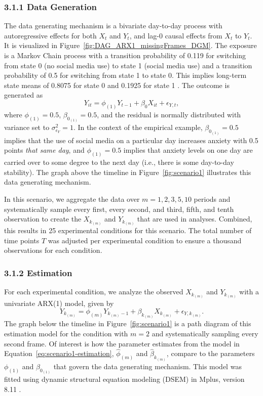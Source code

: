 \documentclass[man]{apa7} %
\begin{document}
\subsubsection{3.1.1 Data Generation} 
The data generating mechanism is a bivariate day-to-day process with autoregressive effects for both $X_{t}$ and $Y_{t}$, and lag-0 causal effects from $X_{t}$ to $Y_{t}$. It is visualized in Figure~\ref{fig:DAG_ARX1_missingFrames_DGM}. The exposure is a Markov Chain process with a transition probability of 0.119 for switching from state 0 (no social media use) to state 1 (social media use) and a transition probability of 0.5 for switching from state 1 to state 0. This implies long-term state means of 0.8075 for state 0 and 0.1925 for state 1 \parencite{hoel_introduction_1986}. The outcome is generated as 
\begin{equation} \label{eq:scenario1-DGM-Y}
    Y_{it} = \phi_{(1)} Y_{t - 1} + \beta_{0} X_{it} + \epsilon_{Y,t}, 
\end{equation}
where $\phi_{(1)} = 0.5$, $\beta_{0_{(1)}} = 0.5$, and the residual is normally distributed with variance set to $\sigma_{\epsilon_{Y}}^{2} = 1$. In the context of the empirical example, $\beta_{0_{(1)}} = 0.5$ implies that the use of social media on a particular day increases anxiety with 0.5 points \textit{that same day}, and $\phi_{(1)} = 0.5$ implies that anxiety levels on one day are carried over to some degree to the next day (i.e., there is some day-to-day stability). The graph above the timeline in Figure~\ref{fig:scenario1} illustrates this data generating mechanism. 

In this scenario, we aggregate the data over $m = 1, 2, 3, 5, 10$ periods and systematically sample every first, every second, and third, fifth, and tenth observation to create the $X_{k_{(m)}}$ and $Y_{k_{(m)}}$ that are used in analyses. Combined, this results in 25 experimental conditions for this scenario. The total number of time points $T$ was adjusted per experimental condition to ensure a thousand observations for each condition. 

\subsubsection{3.1.2 Estimation}
For each experimental condition, we analyze the observed $X_{k_{(m)}}$ and $Y_{k_{(m)}}$ with a univariate ARX(1) model, given by
\begin{equation} \label{eq:scenario1-estimation}
    Y_{k_{(m)}} = \phi_{(m)} Y_{k_{(m)} - 1} + \beta_{k_{(m)}} X_{k_{(m)}} + \epsilon_{Y,k_{(m)}}.
\end{equation}
The graph below the timeline in Figure~\ref{fig:scenario1} is a path diagram of this estimation model for the condition with $m = 2$ and systematically sampling every second frame. Of interest is how the parameter estimates from the model in Equation~\ref{eq:scenario1-estimation}, $\hat{\phi}_{(m)}$ and $\hat{\beta}_{k_{(m)}}$, compare to the parameters $\phi_{(1)}$ and $\beta_{0_{(1)}}$ that govern the data generating mechanism. This model was fitted using dynamic structural equation modeling (DSEM) in Mplus, version 8.11 \parencite{muthen_mplus_2017}. 
\end{document}
